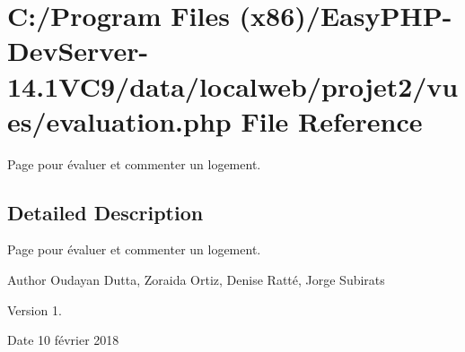 \hypertarget{evaluation_8php}{}\section{C\+:/\+Program Files (x86)/\+Easy\+P\+H\+P-\/\+Dev\+Server-\/14.1\+V\+C9/data/localweb/projet2/vues/evaluation.php File Reference}
\label{evaluation_8php}


Page pour évaluer et commenter un logement.  




\subsection{Detailed Description}
Page pour évaluer et commenter un logement. 

\begin{DoxyAuthor}{Author}
Oudayan Dutta, Zoraida Ortiz, Denise Ratté, Jorge Subirats 
\end{DoxyAuthor}
\begin{DoxyVersion}{Version}
1. 
\end{DoxyVersion}
\begin{DoxyDate}{Date}
10 février 2018 
\end{DoxyDate}
